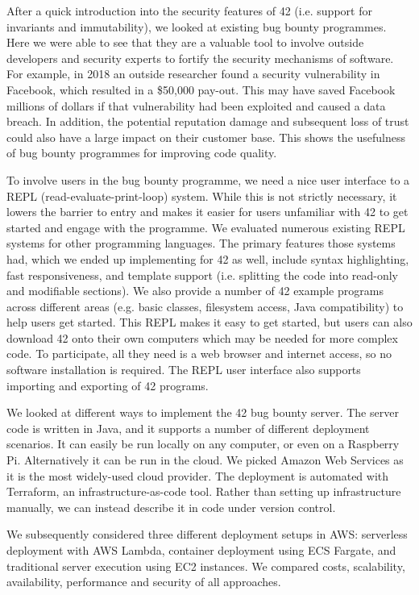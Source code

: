 After a quick introduction into the security features of 42 (i.e. support for invariants and immutability), we looked at existing bug bounty programmes. Here we were able to see that they are a valuable tool to involve outside developers and security experts to fortify the security mechanisms of software. For example, in 2018 an outside researcher found a security vulnerability in Facebook, which resulted in a \$50,000 pay-out. This may have saved Facebook millions of dollars if that vulnerability had been exploited and caused a data breach\cite{newman-2018}. In addition, the potential reputation damage and subsequent loss of trust could also have a large impact on their customer base. This shows the usefulness of bug bounty programmes for improving code quality.

To involve users in the bug bounty programme, we need a nice user interface to a REPL (read-evaluate-print-loop) system. While this is not strictly necessary, it lowers the barrier to entry and makes it easier for users unfamiliar with 42 to get started and engage with the programme. We evaluated numerous existing REPL systems for other programming languages. The primary features those systems had, which we ended up implementing for 42 as well, include syntax highlighting, fast responsiveness, and template support (i.e. splitting the code into read-only and modifiable sections). We also provide a number of 42 example programs across different areas (e.g. basic classes, filesystem access, Java compatibility) to help users get started. This REPL makes it easy to get started, but users can also download 42 onto their own computers which may be needed for more complex code. To participate, all they need is a web browser and internet access, so no software installation is required. The REPL user interface also supports importing and exporting of 42 programs.

We looked at different ways to implement the 42 bug bounty server. The server code is written in Java, and it supports a number of different deployment scenarios. It can easily be run locally on any computer, or even on a Raspberry Pi. Alternatively it can be run in the cloud. We picked Amazon Web Services as it is the most widely-used cloud provider. The deployment is automated with Terraform, an infrastructure-as-code tool. Rather than setting up infrastructure manually, we can instead describe it in code under version control.

We subsequently considered three different deployment setups in AWS: serverless deployment with AWS Lambda, container deployment using ECS Fargate, and traditional server execution using EC2 instances. We compared costs, scalability, availability, performance and security of all approaches.

